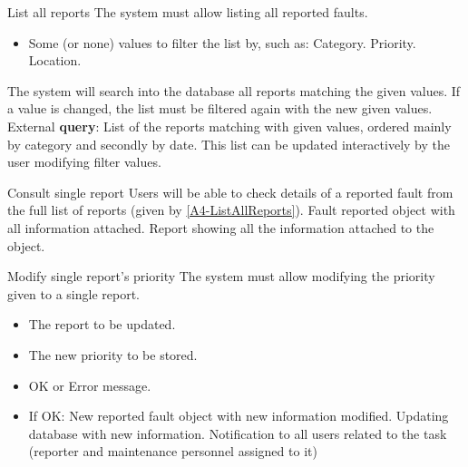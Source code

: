 \begin{requirement}{List all reports}\label{A4-ListAllReports}
\reqdesc The system must allow listing all reported faults.
\reqin 
\begin{itemize}
 	\item Some (or none) values to filter the list by, such as:
 		\subitem Category.
 		\subitem Priority.
 		\subitem Location.
 \end{itemize}
\reqsteps The system will search into the database all reports matching the given values. If a value is changed, the list must be filtered again with the new given values.
\reqout External \textbf{query}: List of the reports matching with given values, ordered mainly by category and secondly by date. This list can be updated interactively by the user modifying filter values.
\end{requirement}

\begin{requirement}{Consult single report}
\reqdesc Users will be able to check details of a reported fault from the full list of reports (given by \ref{A4-ListAllReports}).
\reqin Fault reported object with all information attached.
\reqout Report showing all the information attached to the object.
\end{requirement}

\begin{requirement}{Modify single report's priority}
\reqdesc The system must allow modifying the priority given to a single report. 
\reqin \begin{itemize}
\item The report to be updated.
\item The new priority to be stored.
\end{itemize}
\reqout \begin{itemize}
	\item OK or Error message.
	\item If OK:
	\subitem New reported fault object with new information modified.
	\subitem Updating database with new information.
	\subitem Notification to all users related to the task (reporter and maintenance personnel assigned to it)
\end{itemize}

\end{requirement}

